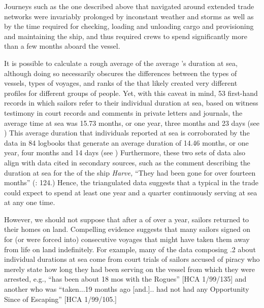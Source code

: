 Journeys such as the one described above that navigated around extended trade networks were invariably prolonged by inconstant weather and storms as well as by the time required for  checking, loading and unloading cargo and provisioning and maintaining the ship, and thus required crews to spend significantly more than a few months aboard the vessel. 

It is possible to calculate a rough average of the average ’s duration at sea, although doing so necessarily obscures the differences between the types of vessels, types of voyages, and ranks of the  that likely created very different profiles for different groups of people. Yet, with this caveat in mind, 53 first-hand records in which sailors refer to their individual duration at sea, based on witness testimony in court records and comments in private letters and journals, the average time at sea was 15.73 months, or one year, three months and 23 days (see ) This average duration that individuals reported at sea is corroborated by the data in 84 logbooks that generate an average  duration of 14.46 months, or one year, four months and 14 days (see ) Furthermore, these two sets of data also align with data cited in secondary sources, such as the comment describing the duration at sea for the  of the  ship \textit{Harve,} “They had been gone for over fourteen months” (\citealt{Bicheno2012}: 124.) Hence, the triangulated data suggests that a typical  in the  trade could expect to spend at least one year and a quarter continuously serving at sea at any one time. 

However, we should not suppose that after a  of over a year, sailors returned to their homes on land. Compelling evidence suggests that many sailors signed on for (or were forced into) consecutive voyages that might have taken them away from life on land indefinitely. For example, many of the data composing .2 about individual durations at sea come from court trials of sailors accused of piracy who merely state how long they had been serving on the vessel from which they were arrested, e.g., “has been about 18 mos with the Rogues” [HCA 1/99/135] and another  who was “taken...19 months ago [and.].. had not had any Opportunity Since of Escaping” [HCA 1/99/105.]


